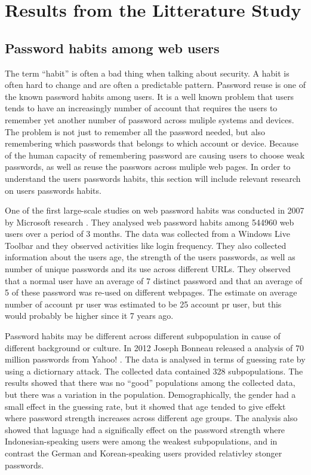 
\section{Results from the Litterature Study}

  \subsection{Password habits among web users}


  The term ``habit'' is often a bad thing when talking about security. A habit is often hard to change and are often a predictable pattern. Password reuse is one of the known password habits among users. It is a well known problem that users tends to have an increasingly number of account that requires the users to remember yet another number of password across muliple systems and devices. The problem is not just to remember all the password needed, but also remembering which passwords that belongs to which account or device. Because of the human capacity of remembering password are causing users to choose weak passwords, as well as reuse the passwors across muliple web pages. In order to understand the users passwords habits, this section will include relevant research on users passwords habits.

  One of the first large-scale studies on web password habits was conducted in 2007 by Microsoft research \cite{habits1}. They analysed web password habits among 544960 web users over a period of 3 months. The data was collected from a Windows Live Toolbar and they observed activities like login frequency. They also collected information about the users age, the strength of the users passwords, as well as number of unique passwords and its use across different URLs. They observed that a normal user have an average of 7 distinct password and that an average of 5 of these password was re-used on different webpages. The estimate on average number of account pr user was estimated to be 25 account pr user, but this would probably be higher since it 7 years ago. 

  Password habits may be different across different subpopulation in cause of different background or culture. In 2012 Joseph Bonneau released a analysis of 70 million passwords from Yahoo! \cite{Bonneau2}. The data is analysed in terms of guessing rate by using a dictiornary attack. The collected data contained 328 subpopulations. The results showed that there was no ``good'' populations among the collected data, but there was a variation in the population. Demographically, the gender had a small effect in the guessing rate, but it showed that age tended to give effekt where password strength increases across different age groups. The analysis also showed that laguage had a significally effect on the password strength where Indonesian-speaking users were among the weakest subpopulations, and in contrast the German and Korean-speaking users provided relativley stonger passwords. 

